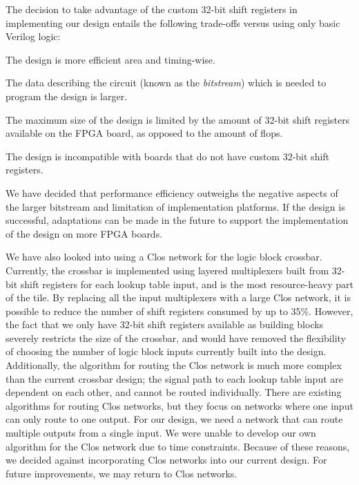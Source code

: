 The decision to take advantage of the custom 32-bit shift registers in implementing our design entails the following trade-offs versus using only basic Verilog logic:
\begin{itemlist}
	\item The design is more efficient area and timing-wise.
	\item The data describing the circuit (known as the \emph{bitstream}) which is needed to program the design is larger.
	\item The maximum size of the design is limited by the amount of 32-bit shift registers available on the FPGA board, as opposed to the amount of flops.
	\item The design is incompatible with boards that do not have custom 32-bit shift registers.
\end{itemlist}

We have decided that performance efficiency outweighs the negative aspects of the larger bitstream and limitation of implementation platforms.
If the design is successful, adaptations can be made in the future to support the implementation of the design on more FPGA boards.

We have also looked into using a Clos network for the logic block crossbar.
Currently, the crossbar is implemented using layered multiplexers built from 32-bit shift registers for each lookup table input, and is the most resource-heavy part of the tile.
By replacing all the input multiplexers with a large Clos network, it is possible to reduce the number of shift registers consumed by up to 35\%.
However, the fact that we only have 32-bit shift registers available as building blocks severely restricts the size of the crossbar, and would have removed the flexibility of choosing the number of logic block inputs currently built into the design.
Additionally, the algorithm for routing the Clos network is much more complex than the current crossbar design; the signal path to each lookup table input are dependent on each other, and cannot be routed individually.
There are existing algorithms for routing Clos networks, but they focus on networks where one input can only route to one output.
For our design, we need a network that can route multiple outputs from a single input.
We were unable to develop our own algorithm for the Clos network due to time constraints.
Because of these reasons, we decided against incorporating Clos networks into our current design.
For future improvements, we may return to Clos networks.


